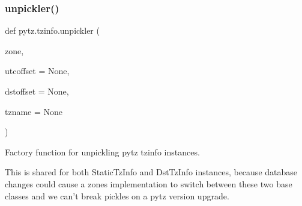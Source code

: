 \subsubsection{\texorpdfstring{unpickler()}{unpickler()}}
{\footnotesize\ttfamily def pytz.\+tzinfo.\+unpickler (\begin{DoxyParamCaption}\item[{}]{zone,  }\item[{}]{utcoffset = {\ttfamily None},  }\item[{}]{dstoffset = {\ttfamily None},  }\item[{}]{tzname = {\ttfamily None} }\end{DoxyParamCaption})}

\begin{DoxyVerb}Factory function for unpickling pytz tzinfo instances.

This is shared for both StaticTzInfo and DstTzInfo instances, because
database changes could cause a zones implementation to switch between
these two base classes and we can't break pickles on a pytz version
upgrade.
\end{DoxyVerb}
 